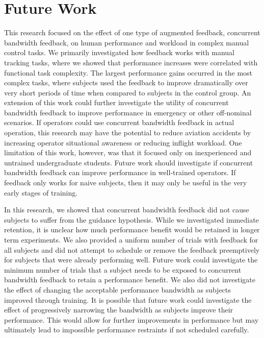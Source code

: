 \section{Future Work}

This research focused on the effect of one type of augmented feedback, concurrent bandwidth feedback, on human performance and workload in complex manual control tasks.
We primarily investigated how feedback works with manual tracking tasks, where we showed that performance increases were correlated with functional task complexity.
The largest performance gains occurred in the most complex tasks, where subjects used the feedback to improve dramatically over very short periods of time when compared to subjects in the control group.
An extension of this work could further investigate the utility of concurrent bandwidth feedback to improve performance in emergency or other off-nominal scenarios.
If operators could use concurrent bandwidth feedback in actual operation, this research may have the potential to reduce aviation accidents by increasing operator situational awareness or reducing inflight workload.
One limitation of this work, however, was that it focused only on inexperienced and untrained undergraduate students.
Future work should investigate if concurrent bandwidth feedback can improve performance in well-trained operators.
If feedback only works for naive subjects, then it may only be useful in the very early stages of training.

In this research, we showed that concurrent bandwidth feedback did not cause subjects to suffer from the guidance hypothesis.
While we investigated immediate retention, it is unclear how much performance benefit would be retained in longer term experiments.
We also provided a uniform number of trials with feedback for all subjects and did not attempt to schedule or remove the feedback preemptively for subjects that were already performing well.
Future work could investigate the minimum number of trials that a subject needs to be exposed to concurrent bandwidth feedback to retain a performance benefit.
We also did not investigate the effect of changing the acceptable performance bandwidth as subjects improved through training.
It is possible that future work could investigate the effect of progressively narrowing the bandwidth as subjects improve their performance.
This would allow for further improvements in performance but may ultimately lead to impossible performance restraints if not scheduled carefully.

